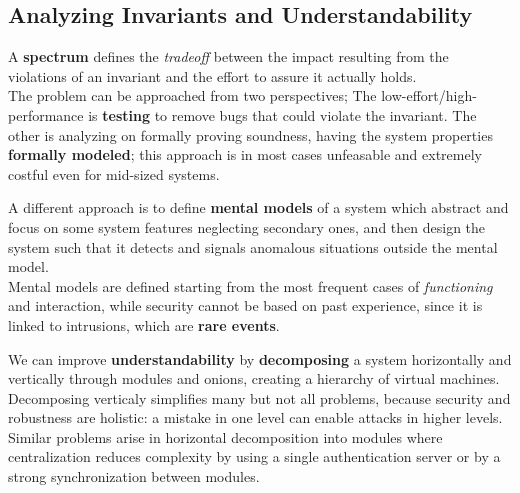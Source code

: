 
\subsection{Analyzing Invariants and Understandability}
A \textbf{spectrum} defines the \textit{tradeoff} between the impact resulting from the violations
of an invariant and the effort to assure it actually holds.\\
The problem can be approached from two perspectives;
The low-effort/high-performance is \textbf{testing} to remove bugs that could violate the invariant.
The other is analyzing on formally proving soundness, having the system properties \textbf{formally modeled};
this approach is in most cases unfeasable and extremely costful even for mid-sized systems.

A different approach is to define \textbf{mental models} of
a system which abstract and focus on some system features neglecting secondary ones, and
then design the system such that it detects and signals anomalous situations outside the mental model.\\
Mental models are defined starting from the most frequent cases of \textit{functioning} and interaction,
while security cannot be based on past experience, 
since it is linked to intrusions, which are \textbf{rare events}.

We can improve \textbf{understandability} by \textbf{decomposing} a system horizontally and
vertically through modules and onions, creating a hierarchy of virtual machines.\\
Decomposing verticaly simplifies many but not all problems, because security and robustness are holistic:
a mistake in one level can enable attacks in higher levels.\\
Similar problems arise in horizontal decomposition into modules where
centralization reduces complexity by using a single authentication server or by
a strong synchronization between modules.

